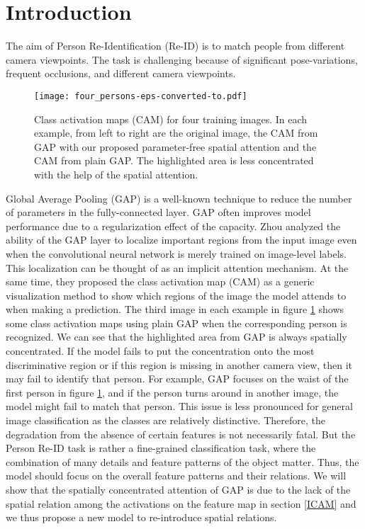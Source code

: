\documentclass[10pt,twocolumn,letterpaper]{article}
\begin{document}
\section{Introduction}
The aim of Person Re-Identification (Re-ID) is to match people from different camera viewpoints. The task is challenging because of  significant pose-variations, frequent occlusions, and different camera viewpoints.

\begin{figure}[t]
  \begin{center}
  \texttt{[image: four\_persons-eps-converted-to.pdf]}
  \end{center}
  \caption{Class activation maps (CAM) for four training images. In each example, from left to right are the original image, the CAM from GAP with our proposed parameter-free spatial attention and the CAM from plain GAP. The highlighted area is less concentrated with the help of the spatial attention.}\label{fig:C}
\end{figure}

Global Average Pooling (GAP) \cite{GAP} is a well-known technique to reduce the number of parameters in the fully-connected layer. GAP often improves model performance due to a regularization effect of the capacity.
Zhou \etal \cite{CAM} analyzed the ability of the GAP layer to localize important regions from the input image even when the convolutional neural network is merely trained on image-level labels. This localization can be thought of as an implicit attention mechanism. At the same time, they proposed the class activation map (CAM) as a generic visualization method to show which regions of the image the model attends to when making a prediction. The third image in each example in figure \ref{fig:C} shows some class activation maps using plain GAP when the corresponding person is recognized. We can see that the highlighted area from GAP is always spatially concentrated. If the model fails to put the concentration onto the most discriminative region or if this region is missing in another camera view, then it may fail to identify that person. For example, GAP focuses on the waist of the first person in figure \ref{fig:C}, and if the person turns around in another image, the model might fail to match that person. This issue is less pronounced for general image classification as the classes are relatively distinctive. Therefore, the degradation from the absence of certain features is not necessarily fatal. But the Person Re-ID task is rather a fine-grained classification task, where the combination of many details and feature patterns of the object matter. Thus, the model should focus on the overall feature patterns and their relations. We will show that the spatially concentrated attention of GAP is  due to the lack of the spatial relation among the activations on the feature map in section \ref{ICAM} and we thus propose a new model to re-introduce spatial relations.
\end{document}
